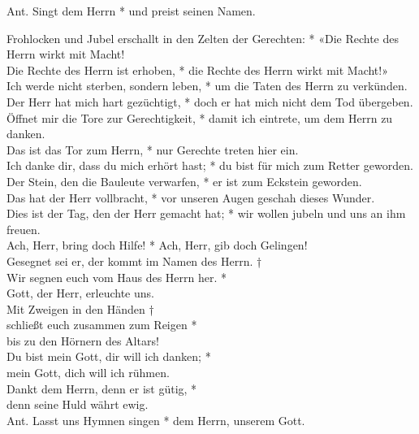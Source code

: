 
Ant. Singt dem Herrn * und preist seinen Namen.\\

Frohlocken und Jubel erschallt in den Zelten der Gerechten: * «Die Rechte des Herrn wirkt mit Macht!\\
Die Rechte des Herrn ist erhoben, * die Rechte des Herrn wirkt mit Macht!»\\
Ich werde nicht sterben, sondern leben, * um die Taten des Herrn zu verkünden.\\
Der Herr hat mich hart gezüchtigt, * doch er hat mich nicht dem Tod übergeben.\\
Öffnet mir die Tore zur Gerechtigkeit, * damit ich eintrete, um dem Herrn zu danken.\\
Das ist das Tor zum Herrn, * nur Gerechte treten hier ein.\\
Ich danke dir, dass du mich erhört hast; * du bist für mich zum Retter geworden.\\
Der Stein, den die Bauleute verwarfen, * er ist zum Eckstein geworden.\\
Das hat der Herr vollbracht, * vor unseren Augen geschah dieses Wunder.\\
Dies ist der Tag, den der Herr gemacht hat; * wir wollen jubeln und uns an ihm freuen.\\
Ach, Herr, bring doch Hilfe! * Ach, Herr, gib doch Gelingen!\\
Gesegnet sei er, der kommt im Namen des Herrn. †\\ Wir segnen euch vom Haus des Herrn her. *\\
Gott, der Herr, erleuchte uns.\\ 
Mit Zweigen in den Händen † \\schließt euch zusammen zum Reigen * \\bis zu den Hörnern des Altars!\\
Du bist mein Gott, dir will ich danken; *\\ mein Gott, dich will ich rühmen.\\
Dankt dem Herrn, denn er ist gütig, *\\ denn seine Huld währt ewig.\\




\vspace{0.6cm}
\def\greinitialformat#1{{\fontsize{40}{40}\selectfont #1}}
\gresetfirstlineaboveinitial{\small \textcolor{red}{Dan 3,57-88}}{}
\setaboveinitialseparation{0.72mm}
\medskip
Ant. Lasst uns Hymnen singen * dem Herrn, unserem Gott.
\newpage



